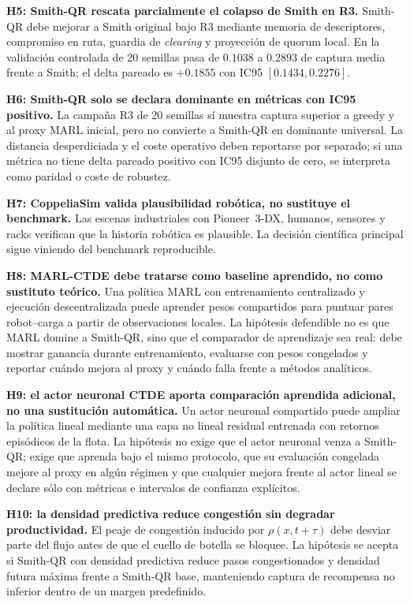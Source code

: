 \textbf{H5: Smith-QR rescata parcialmente el colapso de Smith en R3.}
Smith-QR debe mejorar a Smith original bajo R3 mediante memoria de descriptores,
compromiso en ruta, guardia de \emph{clearing} y proyección de quorum local. En la
validación controlada de 20 semillas pasa de $0.1038$ a $0.2893$ de captura media frente
a Smith; el delta pareado es $+0.1855$ con IC95 $[0.1434,0.2276]$.

\textbf{H6: Smith-QR solo se declara dominante en métricas con IC95 positivo.}
La campaña R3 de 20 semillas sí muestra captura superior a greedy y al proxy MARL inicial, pero no
convierte a Smith-QR en dominante universal. La distancia desperdiciada y el coste
operativo deben reportarse por separado; si una métrica no tiene delta pareado positivo
con IC95 disjunto de cero, se interpreta como paridad o coste de robustez.

\textbf{H7: CoppeliaSim valida plausibilidad robótica, no sustituye el benchmark.}
Las escenas industriales con Pioneer~3-DX, humanos, sensores y racks verifican que la
historia robótica es plausible. La decisión científica principal sigue viniendo del
benchmark reproducible.

\textbf{H8: MARL-CTDE debe tratarse como baseline aprendido, no como sustituto teórico.}
Una política MARL con entrenamiento centralizado y ejecución descentralizada puede
aprender pesos compartidos para puntuar pares robot--carga a partir de observaciones
locales. La hipótesis defendible no es que MARL domine a Smith-QR, sino que el comparador
de aprendizaje sea real: debe mostrar ganancia durante entrenamiento, evaluarse con
pesos congelados y reportar cuándo mejora al proxy y cuándo falla frente a métodos
analíticos.

\textbf{H9: el actor neuronal CTDE aporta comparación aprendida adicional, no una
sustitución automática.}
Un actor neuronal compartido puede ampliar la política lineal mediante una capa no lineal
residual entrenada con retornos episódicos de la flota. La hipótesis no exige que el
actor neuronal venza a Smith-QR; exige que aprenda bajo el mismo protocolo, que su
evaluación congelada mejore al proxy en algún régimen y que cualquier mejora frente al
actor lineal se declare sólo con métricas e intervalos de confianza explícitos.

\textbf{H10: la densidad predictiva reduce congestión sin degradar productividad.}
El peaje de congestión inducido por $\rho(x,t+\tau)$ debe desviar parte del flujo antes
de que el cuello de botella se bloquee. La hipótesis se acepta si Smith-QR con densidad
predictiva reduce pasos congestionados y densidad futura máxima frente a Smith-QR base,
manteniendo captura de recompensa no inferior dentro de un margen predefinido.


